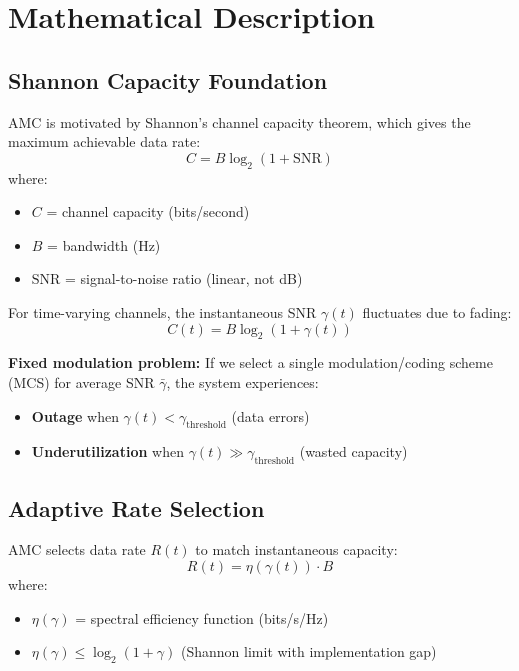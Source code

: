 \section{Mathematical Description}

\subsection{Shannon Capacity Foundation}

AMC is motivated by Shannon's channel capacity theorem, which gives the maximum achievable data rate:
\begin{equation}
C = B \log_2(1 + \text{SNR})
\end{equation}
where:
\begin{itemize}
\item $C$ = channel capacity (bits/second)
\item $B$ = bandwidth (Hz)
\item $\text{SNR}$ = signal-to-noise ratio (linear, not dB)
\end{itemize}

For time-varying channels, the instantaneous SNR $\gamma(t)$ fluctuates due to fading:
\begin{equation}
C(t) = B \log_2(1 + \gamma(t))
\end{equation}

\textbf{Fixed modulation problem:} If we select a single modulation/coding scheme (MCS) for average SNR $\bar{\gamma}$, the system experiences:
\begin{itemize}
\item \textbf{Outage} when $\gamma(t) < \gamma_{\text{threshold}}$ (data errors)
\item \textbf{Underutilization} when $\gamma(t) \gg \gamma_{\text{threshold}}$ (wasted capacity)
\end{itemize}

\subsection{Adaptive Rate Selection}

AMC selects data rate $R(t)$ to match instantaneous capacity:
\begin{equation}
R(t) = \eta(\gamma(t)) \cdot B
\end{equation}
where:
\begin{itemize}
\item $\eta(\gamma)$ = spectral efficiency function (bits/s/Hz)
\item $\eta(\gamma) \leq \log_2(1 + \gamma)$ (Shannon limit with implementation gap)
\end{itemize}

